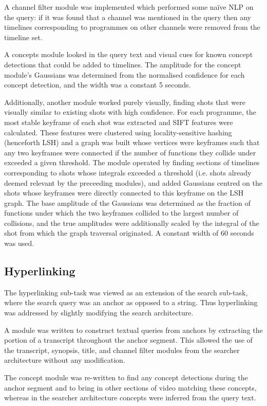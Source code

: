\documentclass{../acm_proc_article-me11_tweaked}
\begin{document}
A channel filter module was implemented which performed some naïve NLP on the 
query: if it was found that a channel was mentioned in the query then any 
timelines corresponding to programmes on other channels were removed from the 
timeline set.

A concepts module looked in the query text and visual cues for known concept 
detections that could be added to timelines. The amplitude for the concept 
module's Gaussians was determined from the normalised confidence for each 
concept detection, and the width was a constant 5 seconds.

Additionally, another module worked purely visually, finding shots that were 
visually similar to existing shots with high confidence. For each programme, 
the most stable keyframe of each shot was extracted and SIFT features were 
calculated. These features were clustered using locality-sensitive hashing 
(henceforth LSH) and a graph was built whose vertices were keyframes such that 
any two keyframes were connected if the number of functions they collide under 
exceeded a given threshold. The module operated by finding sections of 
timelines corresponding to shots whose integrals exceeded a threshold (i.e. 
shots already deemed relevant by the preceeding modules), and added Gaussians 
centred on the shots whose keyframes were directly connected to this keyframe 
on the LSH graph. The base amplitude of the Gaussians was determined as the 
fraction of functions under which the two keyframes collided to the largest 
number of collisions, and the true amplitudes were additionally scaled by the 
integral of the shot from which the graph traversal originated. A constant 
width of 60 seconds was used.

\subsection{Hyperlinking}
The hyperlinking sub-task was viewed as an extension of the search sub-task, 
where the search query was an anchor as opposed to a string. Thus hyperlinking 
was addressed by slightly modifying the search architecture. 

A module was written to construct textual queries from anchors by extracting 
the portion of a transcript throughout the anchor segment. This allowed the 
use of the transcript, synopsis, title, and channel filter modules from the 
searcher architecture without any modification.

The concept module was re-written to find any concept detections during the 
anchor segment and to bring in other sections of video matching these 
concepts, whereas in the searcher architecture concepts were inferred from the 
query text.
\end{document}
